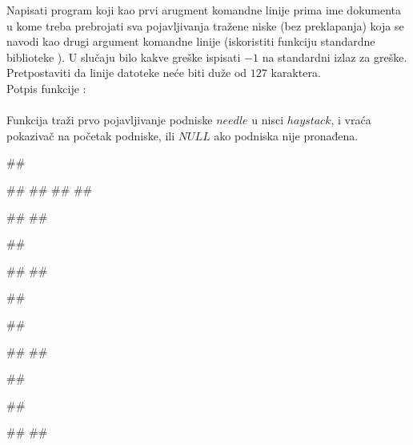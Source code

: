 \begin{Exercise}[label=A_04]
Napisati program koji kao prvi arugment komandne linije prima ime dokumenta u kome treba prebrojati sva pojavljivanja tražene niske (bez preklapanja) koja se navodi kao drugi argument komandne linije (iskoristiti funkciju standardne biblioteke ). U slučaju
bilo kakve greške ispisati $-1$ na standardni izlaz za greške.
Pretpostaviti da linije datoteke neće biti duže od $127$
karaktera.\\
Potpis funkcije :\\
\\
Funkcija traži prvo pojavljivanje podniske $needle$ u nisci
$haystack$, i vraća pokazivač na početak podniske, ili
$NULL$ ako podniska nije pronađena.

\begin{miditest}
\begin{test}{1}
##

##
##
##
##

#\naslovIzlaz#
##
\end{test}
\end{miditest}
\begin{miditest}
\begin{test}{2}
##

#\naslovIzlazZaGresku#
## 
\end{test}
\end{miditest}

\begin{miditest}
\begin{test}{3}
##

##

#\naslovIzlazZaGresku#
##
\end{test}
\end{miditest}
\begin{miditest}
\begin{test}{4}
##

##

#\naslovIzlaz#
##
\end{test}
\end{miditest}

\end{Exercise}
\begin{Answer}[ref=A_04]
\end{Answer}


